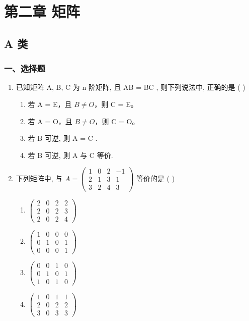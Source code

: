 \documentclass[12pt, a4paper]{ctexart}
\begin{document}
\section{第二章 矩阵}

\subsection{A 类}

\subsubsection*{一、选择题}

\begin{enumerate}
    \item 已知矩阵 A, B, C 为 n 阶矩阵, 且 AB = BC , 则下列说法中, 正确的是 ( \underline{\hspace{1cm}} )
    \begin{enumerate}[label=(\Alph*)]
        \item 若 A = E，且 $ B \neq O $，则 C = E。
        \item 若 A = O，且 $ B \neq O $，则 C = O。
        \item 若 B 可逆, 则 A = C .
        \item 若 B 可逆, 则 A 与 C 等价.
    \end{enumerate}

    \item 下列矩阵中, 与 $ A=\begin{pmatrix}1&0&2&-1\\2&1&3&1\\3&2&4&3\end{pmatrix} $ 等价的是 ( \underline{\hspace{1cm}} )
    \begin{enumerate}[label=(\Alph*)]
        \item $ \begin{pmatrix} 2 & 0 & 2 & 2 \\ 2 & 0 & 2 & 3 \\ 2 & 0 & 2 & 4 \end{pmatrix} $
        \item $ \begin{pmatrix} 1 & 0 & 0 & 0 \\ 0 & 1 & 0 & 1 \\ 0 & 0 & 0 & 1 \end{pmatrix} $
        \item $ \begin{pmatrix} 0 & 0 & 1 & 0 \\ 0 & 1 & 0 & 1 \\ 1 & 0 & 1 & 0 \end{pmatrix} $
        \item $ \begin{pmatrix} 1 & 0 & 1 & 1 \\ 2 & 0 & 2 & 2 \\ 3 & 0 & 3 & 3 \end{pmatrix} $
    \end{enumerate}


\end{enumerate}
\end{document}
